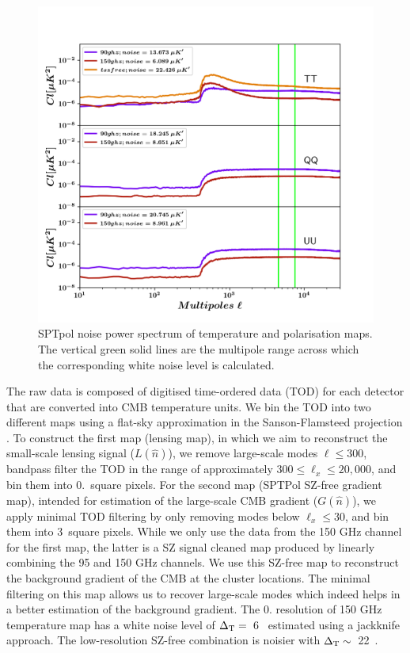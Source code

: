 \begin{figure}[!ht]
\includegraphics[width= \columnwidth]{figs/noise_Cls_sanjay_maps_20170603.png}
\caption{SPTpol noise power spectrum of temperature and polarisation maps. The vertical green solid lines are the multipole range across which the corresponding white noise level is calculated.}
\label{noise_ps}
\end{figure}

The raw data is composed of digitised time-ordered data (TOD) for each detector that are converted into CMB temperature units. %
We bin the TOD into two different maps using a flat-sky approximation in the Sanson-Flamsteed projection \citep{calabretta02, schaffer11}. 
To construct the first map (lensing map), in which we aim to reconstruct the small-scale lensing signal ($L(\hat{n})$), we remove large-scale modes $\ell \le 300$, bandpass filter the TOD in the range of approximately $300 \le \ell_{x} \le 20,000$, and bin them into 0.\ square pixels.
For the second map (SPTPol SZ-free gradient map), intended for estimation of the large-scale CMB gradient ($G(\hat{n})$), we apply minimal TOD filtering by only removing modes below $\ell_{x} \le 30$, and bin them into 3\am\ square pixels.
While we only use the data from the 150 GHz channel for the first map, the latter is a SZ signal cleaned map produced by linearly combining the 95 and 150 GHz channels. 
We use this SZ-free map to reconstruct the background gradient of the CMB at the cluster locations.
The minimal filtering on this map allows us to recover large-scale modes which indeed helps in a better estimation of the background gradient.
The 0. resolution of 150 GHz temperature map has a white noise level of \mbox{$\Delta_{\rm T} = $ 6 \ukam} estimated using a jackknife approach. %
The low-resolution SZ-free combination is noisier with \mbox{$\Delta_{\rm T} \sim $ 22 \ukam}.

